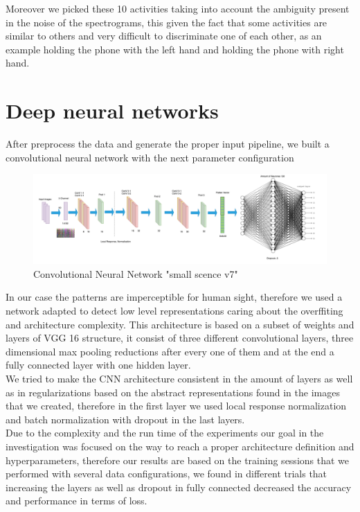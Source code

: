 \documentclass[10pt,halfline,a4paper]{ouparticle}
\begin{document}
\noindent
Moreover we picked these 10 activities taking into account the ambiguity present in the noise of the spectrograms, this given the fact that some activities are similar to others and very difficult to discriminate one of each other, as an example holding the phone with the left hand and holding the phone with right hand. 

\section{Deep neural networks}

\noindent
After preprocess the data and generate the proper input pipeline, we built a convolutional neural network with the next parameter configuration\\

\begin{figure}[H]
	\centering
	\includegraphics[width=0.9\linewidth]{small_sence}
	\caption{Convolutional Neural Network "small scence v7"}
	\label{fig:smallsence}
\end{figure}

\noindent
 In our case the patterns are imperceptible for human sight, therefore we used a network adapted to detect low level representations caring about the overffiting and architecture complexity. This architecture is based on a subset of weights and layers of VGG 16 structure, it consist of three different convolutional layers, three dimensional max pooling reductions after every one of them and at the end a fully connected layer with one hidden layer.\\

\noindent
We tried to make the CNN architecture consistent in the amount of layers as well as in regularizations based on the abstract representations found in the images that we created, therefore in the first layer we used local response normalization and batch normalization with dropout in the last layers. \\

\noindent
Due to the complexity and the run time of the experiments our goal in the investigation was focused on the way to reach a proper architecture definition and hyperparameters, therefore our results are based on the training sessions that we performed with several data configurations, we found in different trials that increasing the layers as well as dropout in fully connected decreased the accuracy and performance in terms of loss. \\
\end{document}
